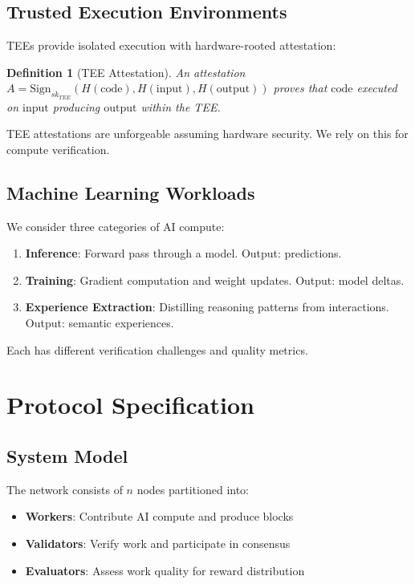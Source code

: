 \documentclass[11pt,letterpaper]{article}
\newtheorem{definition}{Definition}[section]
\begin{document}
\subsection{Trusted Execution Environments}

TEEs provide isolated execution with hardware-rooted attestation:

\begin{definition}[TEE Attestation]
An attestation $A = \text{Sign}_{sk_{TEE}}(H(\text{code}), H(\text{input}), H(\text{output}))$ proves that $\text{code}$ executed on $\text{input}$ producing $\text{output}$ within the TEE.
\end{definition}

TEE attestations are unforgeable assuming hardware security. We rely on this for compute verification.

\subsection{Machine Learning Workloads}

We consider three categories of AI compute:

\begin{enumerate}
    \item \textbf{Inference}: Forward pass through a model. Output: predictions.
    \item \textbf{Training}: Gradient computation and weight updates. Output: model deltas.
    \item \textbf{Experience Extraction}: Distilling reasoning patterns from interactions. Output: semantic experiences.
\end{enumerate}

Each has different verification challenges and quality metrics.

\section{Protocol Specification}
\label{sec:protocol}

\subsection{System Model}

The network consists of $n$ nodes partitioned into:

\begin{itemize}
    \item \textbf{Workers}: Contribute AI compute and produce blocks
    \item \textbf{Validators}: Verify work and participate in consensus
    \item \textbf{Evaluators}: Assess work quality for reward distribution
\end{itemize}
\end{document}
